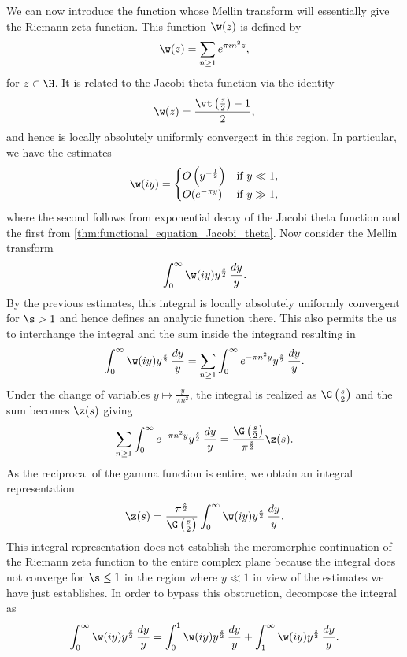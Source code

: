 \documentclass[12pt]{article}
\begin{document}
      We can now introduce the function whose Mellin transform will essentially give the Riemann zeta function. This function \(\w(z)\) is defined by
      \[
        \w(z) = \sum_{n \ge 1}e^{\pi in^{2}z},
      \]
      for \(z \in \H\). It is related to the Jacobi theta function via the identity
      \[
        \w(z) = \frac{\vt\left(\frac{z}{2}\right)-1}{2},
      \]
      and hence is locally absolutely uniformly convergent in this region. In particular, we have the estimates
      \[
        \w(iy) = \begin{cases} O\left(y^{-\frac{1}{2}}\right) & \text{if \(y \ll 1\)}, \\ O(e^{-\pi y}) & \text{if \(y \gg 1\)}, \end{cases}
      \]
      where the second follows from exponential decay of the Jacobi theta function and the first from \cref{thm:functional_equation_Jacobi_theta}. Now consider the Mellin transform
      \[
        \int_{0}^{\infty}\w(iy)y^{\frac{s}{2}}\,\frac{dy}{y}.
      \]
      By the previous estimates, this integral is locally absolutely uniformly convergent for \(\s > 1\) and hence defines an analytic function there. This also permits the us to interchange the integral and the sum inside the integrand resulting in
      \[
        \int_{0}^{\infty}\w(iy)y^{\frac{s}{2}}\,\frac{dy}{y} = \sum_{n \ge 1}\int_{0}^{\infty}e^{-\pi n^{2}y}y^{\frac{s}{2}}\,\frac{dy}{y}.
      \]
      Under the change of variables \(y \mapsto \frac{y}{\pi n^{2}}\), the integral is realized as \(\G\left(\frac{s}{2}\right)\) and the sum becomes \(\z(s)\) giving
      \[
        \sum_{n \ge 1}\int_{0}^{\infty}e^{-\pi n^{2}y}y^{\frac{s}{2}}\,\frac{dy}{y} = \frac{\G\left(\frac{s}{2}\right)}{\pi^{\frac{s}{2}}}\z(s).
      \]
      As the reciprocal of the gamma function is entire, we obtain an integral representation
      \begin{equation}\label{equ:integral_representation_zeta_1}
        \z(s) = \frac{\pi^{\frac{s}{2}}}{\G\left(\frac{s}{2}\right)}\int_{0}^{\infty}\w(iy)y^{\frac{s}{2}}\,\frac{dy}{y}.
      \end{equation}
      This integral representation does not establish the meromorphic continuation of the Riemann zeta function to the entire complex plane because the integral does not converge for \(\s \le 1\) in the region where \(y \ll 1\) in view of the estimates we have just establishes. In order to bypass this obstruction, decompose the integral as
      \begin{equation}\label{equ:symmetric_integral_zeta_split}
        \int_{0}^{\infty}\w(iy)y^{\frac{s}{2}}\,\frac{dy}{y} = \int_{0}^{1}\w(iy)y^{\frac{s}{2}}\,\frac{dy}{y}+\int_{1}^{\infty}\w(iy)y^{\frac{s}{2}}\,\frac{dy}{y}.
      \end{equation}
\end{document}
